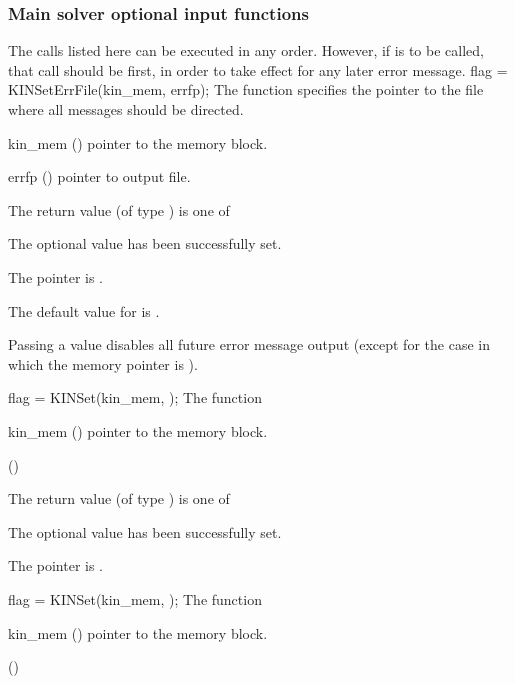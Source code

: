 \subsubsection{Main solver optional input functions}
The calls listed here can be executed in any order. However, if  
is to be called, that call should be first, in order to take effect for any later 
error message.
{
flag = KINSetErrFile(kin\_mem, errfp);
}
{
  The function  specifies the pointer to the file
  where all {\kinsol} messages should be directed.
}
{
  \begin{args}
  \item[kin\_mem] ()
    pointer to the {\kinsol} memory block.
  \item[errfp] ()
    pointer to output file.
  \end{args}
}
{
  The return value  (of type ) is one of
  \begin{args}
  \item[\Id{KIN\_SUCCESS}] 
    The optional value has been successfully set.
  \item[\Id{KIN\_MEM\_NULL}]
    The  pointer is .
  \end{args}
}
{
  The default value for  is .

  Passing a value  disables all future error message output
  (except for the case in which the {\kinsol} memory pointer is ).
}
{
flag = KINSet(kin\_mem, );
}
{
  The function 
}
{
  \begin{args}
  \item[kin\_mem] ()
    pointer to the {\kinsol} memory block.
  \item[] (\id{})

  \end{args}
}
{
  The return value  (of type ) is one of
  \begin{args}
  \item[\Id{KIN\_SUCCESS}] 
    The optional value has been successfully set.
  \item[\Id{KIN\_MEM\_NULL}]
    The  pointer is .
  \end{args}
}
{}
{
flag = KINSet(kin\_mem, );
}
{
  The function 
}
{
  \begin{args}
  \item[kin\_mem] ()
    pointer to the {\kinsol} memory block.
  \item[] (\id{})

  \end{args}
}
